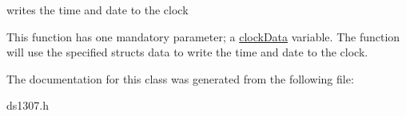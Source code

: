 writes the time and date to the clock 

This function has one mandatory parameter; a \hyperlink{structclockData}{clock\+Data} variable. The function will use the specified structs data to write the time and date to the clock. 

The documentation for this class was generated from the following file\+:\begin{DoxyCompactItemize}
\item 
ds1307.\+h\end{DoxyCompactItemize}
